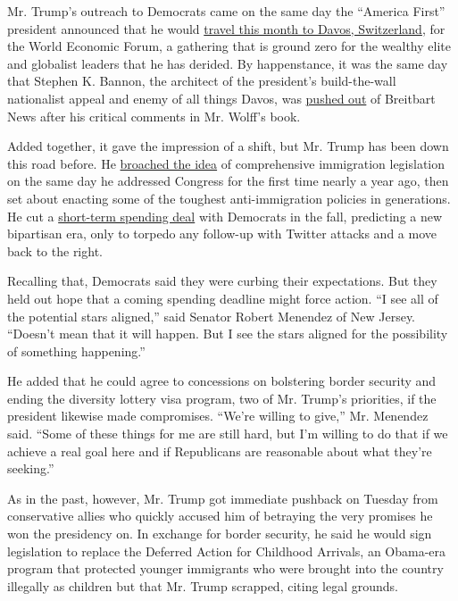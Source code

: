 Mr. Trump's outreach to Democrats came on the same day the ``America
First'' president announced that he would
\href{https://www.nytimes3xbfgragh.onion/2018/01/09/us/politics/trump-davos-world-economic-forum.html}{travel
this month to Davos, Switzerland}, for the World Economic Forum, a
gathering that is ground zero for the wealthy elite and globalist
leaders that he has derided. By happenstance, it was the same day that
Stephen K. Bannon, the architect of the president's build-the-wall
nationalist appeal and enemy of all things Davos, was
\href{https://www.nytimes3xbfgragh.onion/2018/01/09/us/politics/steve-bannon-breitbart-trump.html?hp\&action=click\&pgtype=Homepage\&clickSource=story-heading\&module=first-column-region\&region=top-news\&WT.nav=top-news}{pushed
out} of Breitbart News after his critical comments in Mr. Wolff's book.

Added together, it gave the impression of a shift, but Mr. Trump has
been down this road before. He
\href{https://www.nytimes3xbfgragh.onion/2017/03/01/us/politics/trump-undocumented-immigrants.html}{broached
the idea} of comprehensive immigration legislation on the same day he
addressed Congress for the first time nearly a year ago, then set about
enacting some of the toughest anti-immigration policies in generations.
He cut a
\href{https://www.nytimes3xbfgragh.onion/2017/09/06/us/politics/house-vote-harvey-aid-debt-ceiling.html}{short-term
spending deal} with Democrats in the fall, predicting a new bipartisan
era, only to torpedo any follow-up with Twitter attacks and a move back
to the right.

Recalling that, Democrats said they were curbing their expectations. But
they held out hope that a coming spending deadline might force action.
``I see all of the potential stars aligned,'' said Senator Robert
Menendez of New Jersey. ``Doesn't mean that it will happen. But I see
the stars aligned for the possibility of something happening.''

He added that he could agree to concessions on bolstering border
security and ending the diversity lottery visa program, two of Mr.
Trump's priorities, if the president likewise made compromises. ``We're
willing to give,'' Mr. Menendez said. ``Some of these things for me are
still hard, but I'm willing to do that if we achieve a real goal here
and if Republicans are reasonable about what they're seeking.''

As in the past, however, Mr. Trump got immediate pushback on Tuesday
from conservative allies who quickly accused him of betraying the very
promises he won the presidency on. In exchange for border security, he
said he would sign legislation to replace the Deferred Action for
Childhood Arrivals, an Obama-era program that protected younger
immigrants who were brought into the country illegally as children but
that Mr. Trump scrapped, citing legal grounds.

